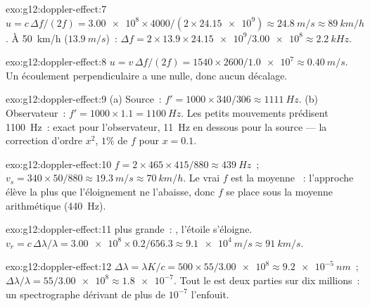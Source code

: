 \begin{solution}{exo:g12:doppler-effect:7}
$u = c\,\Delta f/(2f) = \num{3.00e8} \times 4000/(2 \times \num{24.15e9}) \approx
\qty{24.8}{m/s} \approx \qty{89}{km/h}$. À \qty{50}{km/h} ($\qty{13.9}{m/s}$)~:
$\Delta f = 2 \times 13.9 \times \num{24.15e9}/\num{3.00e8} \approx \qty{2.2}{kHz}$.
\end{solution}

\begin{solution}{exo:g12:doppler-effect:8}
$u = v\,\Delta f/(2f) = 1540 \times 2600/\num{1.0e7} \approx \qty{0.40}{m/s}$.
Un écoulement perpendiculaire a une  nulle, donc aucun décalage.
\end{solution}

\begin{solution}{exo:g12:doppler-effect:9}
(a) Source~: $f' = 1000 \times 340/306 \approx \qty{1111}{Hz}$. (b) Observateur~:
$f' = 1000 \times 1.1 = \qty{1100}{Hz}$. Les petits mouvements prédisent \qty{1100}{Hz}~: exact
pour l'observateur, \qty{11}{Hz} en dessous pour la source --- la correction d'ordre $x^2$,
$1\%$ de $f$ pour $x = 0.1$.
\end{solution}

\begin{solution}{exo:g12:doppler-effect:10}
$f = 2 \times 465 \times 415/880 \approx \qty{439}{Hz}$~;
$v_s = 340 \times 50/880 \approx \qty{19.3}{m/s} \approx \qty{70}{km/h}$. Le vrai $f$
est la moyenne ~: l'approche élève la  plus que l'éloignement
ne l'abaisse, donc $f$ se place sous la moyenne arithmétique (\qty{440}{Hz}).
\end{solution}

\begin{solution}{exo:g12:doppler-effect:11}
 plus grande~: , l'étoile s'éloigne.
$v_r = c\,\Delta\lambda/\lambda =
\num{3.00e8} \times 0.2/656.3 \approx \qty{9.1e4}{m/s} \approx \qty{91}{km/s}$.
\end{solution}

\begin{solution}{exo:g12:doppler-effect:12}
$\Delta\lambda = \lambda K/c = 500 \times 55/\num{3.00e8} \approx \qty{9.2e-5}{nm}$~;
$\Delta\lambda/\lambda = 55/\num{3.00e8} \approx \num{1.8e-7}$. Tout le  est deux
parties sur dix millions~: un spectrographe dérivant de plus de $10^{-7}$ l'enfouit.
\end{solution}

